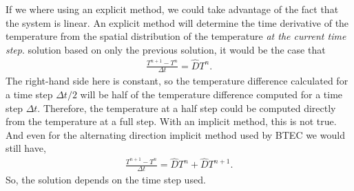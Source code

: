 \documentclass[letterpaper]{report}
\begin{document}
If we where using an explicit method, we could take advantage of the fact that the system is linear. An explicit method will determine the time
derivative of the temperature from the spatial distribution of the temperature \emph{at the current time step}.
solution based on only the previous solution, it would be the case that
\begin{align}
  \frac{ T^{n+1} - T^n }{ \Delta t } = \hat{D} T^{n}.
\end{align}
The right-hand side here is constant, so the temperature difference calculated for a time step $\Delta t/2$ will be half of the temperature difference
computed for a time step $\Delta t$. Therefore, the temperature at a half step could be computed directly from the temperature at a full step. With
an implicit method, this is not true. And even for the alternating direction implicit method used by BTEC we would still have,
\begin{align}
  \frac{ T^{n+1} - T^n }{ \Delta t } = \hat{D} T^{n} + \hat{D} T^{n+1}.
\end{align}
So, the solution depends on the time step used.
\end{document}
